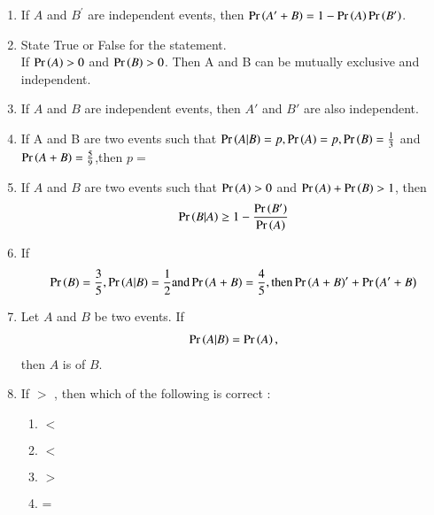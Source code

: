 \begin{enumerate}[resume*]
\item If $A$ and $B^\prime$ are independent events, then $\Pr\left(A^\prime+B\right)=1-\Pr\left(A\right)\Pr\left(B^\prime\right)$.\\

\item State True or False for the statement. \\ 
If $\Pr\left(A\right)>0$ and $\Pr\left(B\right)>0$. Then A and B can be mutually exclusive and independent. \\
\solution 

\item If $A$ and $B$ are independent events, then $A'$ and $B'$ are also independent.\\
\solution

\item If A and B are two events such that $\Pr\left(A|B\right)=p,\Pr\left(A\right)=p,\Pr\left(B\right)=\frac{1}{3}$ and $\Pr\left(A+B\right)=\frac{5}{9}$,then $p=$\\
\solution

\item If $A$ and $B$ are two events such that $\Pr\left(A\right) > 0$ and $\Pr\left(A\right) + \Pr\left(B\right) > 1$, then 
\begin{align*}
    \Pr\left(B | A\right) \geq 1 - \frac{\Pr\left(B^\prime\right)}{\Pr\left(A\right)}
\end{align*}
\solution

\item If 
\begin{align}
\Pr\left(B\right) = \frac{3}{5},
\Pr\left(A|B\right) = \frac{1}{2} \text{and}
\Pr\left(A + B\right) = \frac{4}{5}, \text{then}
\Pr\left(A + B\right)^{\prime} + \Pr\left(A^{\prime} + B\right)
\end{align}
\solution

\item Let $A$ and $B$ be two events. If 
\begin{align}
\Pr\left(A|B\right) = \Pr\left(A\right),
\end{align} 
then $A$ is of $B$.\\
\solution

\item

 If  $>$ , then which of the following is correct :

\begin{enumerate}[label=(\Alph*)]

 \item  
 \label{12.13.6.18.A}
  $<$ \\
 \item 
  \label{12.13.6.18.B}
  $<$ \\
 \item 
 \label{12.13.6.18.C}
  $>$ \\
 \item 
  \label{12.13.6.18.D}
  = \\

 \end{enumerate}

\end{enumerate}
